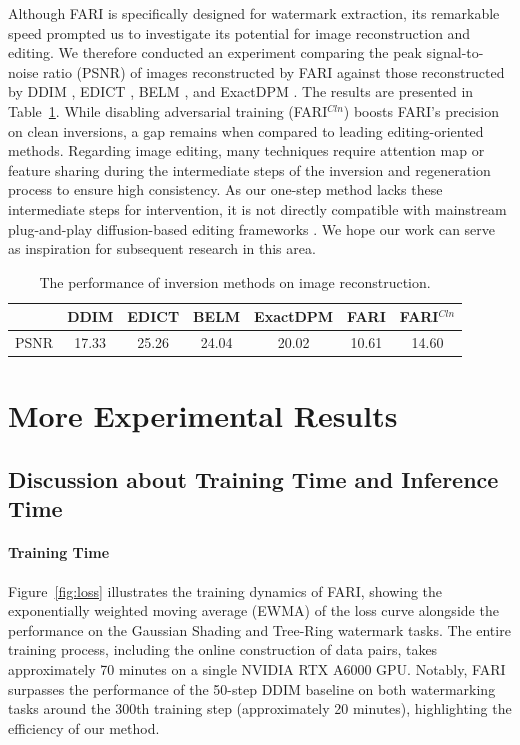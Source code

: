 \documentclass{article}
\begin{document}
Although FARI is specifically designed for watermark extraction, its remarkable speed prompted us to investigate its potential for image reconstruction and editing. We therefore conducted an experiment comparing the peak signal-to-noise ratio (PSNR) of images reconstructed by FARI against those reconstructed by DDIM \citep{ddim_2021}, EDICT \citep{edict2023}, BELM \citep{belm2024}, and ExactDPM \citep{exactdpm2024}. The results are presented in Table~\ref{tab:reconstruction_psnr}. While disabling adversarial training (FARI$^{Cln}$) boosts FARI's precision on clean inversions, a gap remains when compared to leading editing-oriented methods. Regarding image editing, many techniques require attention map or feature sharing during the intermediate steps of the inversion and regeneration process to ensure high consistency. As our one-step method lacks these intermediate steps for intervention, it is not directly compatible with mainstream plug-and-play diffusion-based editing frameworks \citep{ptp2022}. We hope our work can serve as inspiration for subsequent research in this area.

\begin{table}[h]
\caption{The performance of inversion methods on image reconstruction.}
\label{tab:reconstruction_psnr}
\centering
\begin{tabular}{ccccccc}
\toprule
& DDIM & EDICT  & BELM & ExactDPM & FARI & FARI$^{Cln}$ \\
\midrule
PSNR & 17.33 & 25.26 & 24.04 & 20.02 & 10.61 & 14.60  \\
\bottomrule
\end{tabular}
\end{table}


\section{More Experimental Results}
\label{sec:app_exp_res}

\subsection{Discussion about Training Time and Inference Time}

\paragraph{Training Time}
Figure~\ref{fig:loss} illustrates the training dynamics of FARI, showing the exponentially weighted moving average (EWMA) of the loss curve alongside the performance on the Gaussian Shading \citep{gs_2024} and Tree-Ring \citep{treering_2023} watermark tasks. The entire training process, including the online construction of data pairs, takes approximately 70 minutes on a single NVIDIA RTX A6000 GPU. Notably, FARI surpasses the performance of the 50-step DDIM baseline on both watermarking tasks around the 300th training step (approximately 20 minutes), highlighting the efficiency of our method.
\end{document}
